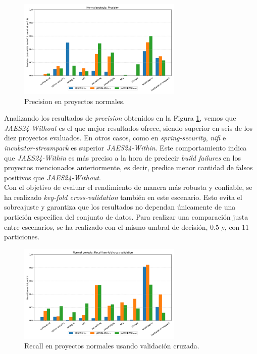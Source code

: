 \begin{figure}
    \centering
    \includegraphics[width=0.7\textwidth]{images/Normal projects: Precision.pdf}
    \caption{Precision en proyectos normales.}
    \label{fig:train_test_precision_normal_projects}
\end{figure}

Analizando los resultados de \textit{precision} obtenidos en la Figura
\ref{fig:train_test_precision_normal_projects}, vemos que \textit{JAES24-Without} es el que mejor
resultados ofrece, siendo superior en seis de los diez proyectos evaluados. En otros casos, como
en \textit{spring-security}, \textit{nifi} e \textit{incubator-streampark} es superior 
\textit{JAES24-Within}. Este comportamiento indica que \textit{JAES24-Within} es más preciso
a la hora de predecir \textit{build failures} en los proyectos mencionados anteriormente, es decir, 
predice menor cantidad de falsos positivos que \textit{JAES24-Without}.\\

Con el objetivo de evaluar el rendimiento de manera más robusta y confiable, se ha realizado
\textit{key-fold cross-validation} también en este escenario. Esto evita el sobreajuste y
garantiza que los resultados no dependan únicamente de una partición específica del conjunto
de datos. Para realizar una comparación justa entre escenarios, se ha realizado con el mismo
umbral de decisión, $0.5$ y, con $11$ particiones.

\begin{figure}[H]
    \centering
    \includegraphics[width=0.7\textwidth]{images/Normal projects: Recall key-fold cross validation.pdf}
    \caption{Recall en proyectos normales usando validación cruzada.}
    \label{fig:key-fold_recall_normal_projects}
\end{figure}

